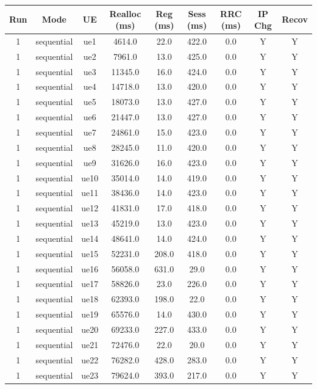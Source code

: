 \begin{table}[ht]
\centering
\begin{tabular}{|c|c|c|c|c|c|c|c|c|}
\hline
Run & Mode & UE & Realloc (ms) & Reg (ms) & Sess (ms) & RRC (ms) & IP Chg & Recov \\
\hline
1 & sequential & ue1 & 4614.0 & 22.0 & 422.0 & 0.0 & Y & Y \\
1 & sequential & ue2 & 7961.0 & 13.0 & 425.0 & 0.0 & Y & Y \\
1 & sequential & ue3 & 11345.0 & 16.0 & 424.0 & 0.0 & Y & Y \\
1 & sequential & ue4 & 14718.0 & 13.0 & 420.0 & 0.0 & Y & Y \\
1 & sequential & ue5 & 18073.0 & 13.0 & 427.0 & 0.0 & Y & Y \\
1 & sequential & ue6 & 21447.0 & 13.0 & 427.0 & 0.0 & Y & Y \\
1 & sequential & ue7 & 24861.0 & 15.0 & 423.0 & 0.0 & Y & Y \\
1 & sequential & ue8 & 28245.0 & 11.0 & 420.0 & 0.0 & Y & Y \\
1 & sequential & ue9 & 31626.0 & 16.0 & 423.0 & 0.0 & Y & Y \\
1 & sequential & ue10 & 35014.0 & 14.0 & 419.0 & 0.0 & Y & Y \\
1 & sequential & ue11 & 38436.0 & 14.0 & 423.0 & 0.0 & Y & Y \\
1 & sequential & ue12 & 41831.0 & 17.0 & 418.0 & 0.0 & Y & Y \\
1 & sequential & ue13 & 45219.0 & 13.0 & 423.0 & 0.0 & Y & Y \\
1 & sequential & ue14 & 48641.0 & 14.0 & 424.0 & 0.0 & Y & Y \\
1 & sequential & ue15 & 52231.0 & 208.0 & 418.0 & 0.0 & Y & Y \\
1 & sequential & ue16 & 56058.0 & 631.0 & 29.0 & 0.0 & Y & Y \\
1 & sequential & ue17 & 58826.0 & 23.0 & 226.0 & 0.0 & Y & Y \\
1 & sequential & ue18 & 62393.0 & 198.0 & 22.0 & 0.0 & Y & Y \\
1 & sequential & ue19 & 65576.0 & 14.0 & 430.0 & 0.0 & Y & Y \\
1 & sequential & ue20 & 69233.0 & 227.0 & 433.0 & 0.0 & Y & Y \\
1 & sequential & ue21 & 72476.0 & 22.0 & 20.0 & 0.0 & Y & Y \\
1 & sequential & ue22 & 76282.0 & 428.0 & 283.0 & 0.0 & Y & Y \\
1 & sequential & ue23 & 79624.0 & 393.0 & 217.0 & 0.0 & Y & Y \\

\end{tabular}
\end{table}
